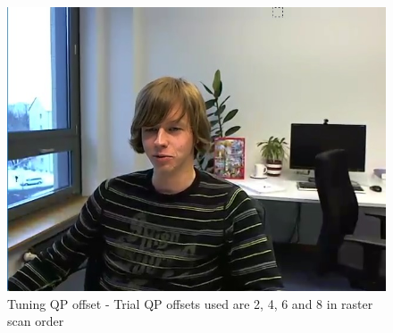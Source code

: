 \documentclass[11pt]{article} %
\begin{document}
\begin{figure}[!h]
    \includegraphics[scale=0.43]{QPOffset/trialOffset/Paul250kbps_offset8}  
    \caption{Tuning QP offset - Trial QP offsets used are 2, 4, 6 and 8 in raster scan order}
    \label{fig:Default_QPOffsetTuning}
\end{figure}
\fi
\end{document}
